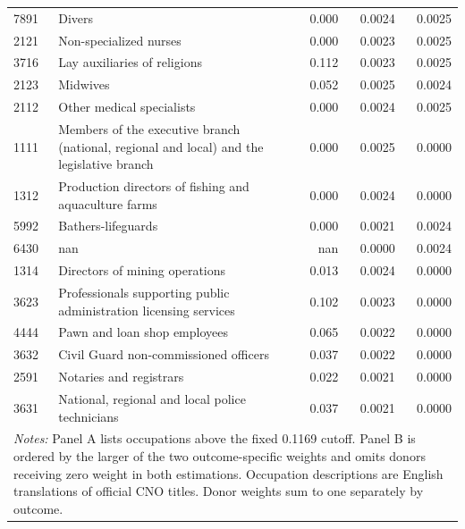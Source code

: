 \begin{longtable}{p{}>{\raggedright\arraybackslash}p{}rrr}
7891 & Divers & 0.000 & 0.0024 & 0.0025 \\
2121 & Non-specialized nurses & 0.000 & 0.0023 & 0.0025 \\
3716 & Lay auxiliaries of religions & 0.112 & 0.0023 & 0.0025 \\
2123 & Midwives & 0.052 & 0.0025 & 0.0024 \\
2112 & Other medical specialists & 0.000 & 0.0024 & 0.0025 \\
1111 & Members of the executive branch (national, regional and local) and the legislative branch & 0.000 & 0.0025 & 0.0000 \\
1312 & Production directors of fishing and aquaculture farms & 0.000 & 0.0024 & 0.0000 \\
5992 & Bathers-lifeguards & 0.000 & 0.0021 & 0.0024 \\
6430 & nan & nan & 0.0000 & 0.0024 \\
1314 & Directors of mining operations & 0.013 & 0.0024 & 0.0000 \\
3623 & Professionals supporting public administration licensing services & 0.102 & 0.0023 & 0.0000 \\
4444 & Pawn and loan shop employees & 0.065 & 0.0022 & 0.0000 \\
3632 & Civil Guard non-commissioned officers & 0.037 & 0.0022 & 0.0000 \\
2591 & Notaries and registrars & 0.022 & 0.0021 & 0.0000 \\
3631 & National, regional and local police technicians & 0.037 & 0.0021 & 0.0000 \\
\midrule
\multicolumn{5}{p{0.93\textwidth}}{\footnotesize \emph{Notes:} Panel A lists occupations above the fixed 0.1169 cutoff. Panel B is ordered by the larger of the two outcome-specific weights and omits donors receiving zero weight in both estimations. Occupation descriptions are English translations of official CNO titles. Donor weights sum to one separately by outcome.} \\
\bottomrule
\end{longtable}
\normalsize
